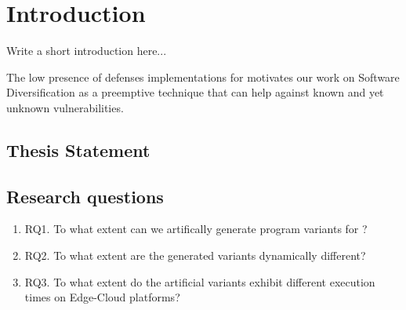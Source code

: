 \chapter{Introduction}


\newcommand{\rqone}{RQ1. To what extent can we artifically generate program variants for \wasm?}

\newcommand{\rqtwo}{RQ2. To what extent are the generated variants dynamically different?}
\newcommand{\rqthree}{RQ3. To what extent do the artificial variants exhibit different execution times on Edge-Cloud platforms?}

Write a short introduction here...







The low presence of defenses implementations for \wasm motivates our work on Software Diversification as a preemptive technique that can help against known and yet unknown vulnerabilities.


\section{Thesis Statement}



\section{Research questions}
\label{intro:definition:rq}


\begin{enumerate}
    \item \rqone

    \item \rqtwo
    
    \item \rqthree
    
\end{enumerate}

